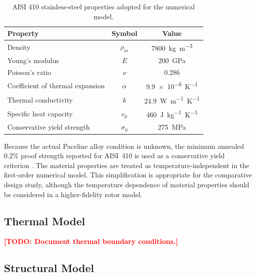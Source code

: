 \documentclass[11pt,a4paper]{article}
\newcommand{\todo}[1]{\textcolor{red}{\textbf{[TODO: #1]}}}
\begin{document}
\begin{table}[H]
    \centering
    \caption{AISI 410 stainless-steel properties adopted for the numerical model.}
    \label{tab:material_properties}
    \begin{tabular}{l c c}
        \toprule
        Property & Symbol & Value \\
        \midrule
        Density
        & $\rho_m$
        & \SI{7800}{kg.m^{-3}} \\

        Young's modulus
        & $E$
        & \SI{200}{GPa} \\

        Poisson's ratio
        & $\nu$
        & 0.286 \\

        Coefficient of thermal expansion
        & $\alpha$
        & \SI{9.9e-6}{K^{-1}} \\

        Thermal conductivity
        & $k$
        & \SI{24.9}{W.m^{-1}.K^{-1}} \\

        Specific heat capacity
        & $c_p$
        & \SI{460}{J.kg^{-1}.K^{-1}} \\

        Conservative yield strength
        & $\sigma_y$
        & \SI{275}{MPa} \\
        \bottomrule
    \end{tabular}
\end{table}

Because the actual Paceline alloy condition is unknown, the minimum
annealed 0.2\% proof strength reported for AISI~410 is used as a conservative
yield criterion \cite{Atlas410}. The material properties are treated as
temperature-independent in the first-order numerical model. This
simplification is appropriate for the comparative design study, although the
temperature dependence of material properties should be considered in a
higher-fidelity rotor model.

\subsection{Thermal Model}


\todo{Document thermal boundary conditions.}


\subsection{Structural Model}
\end{document}
